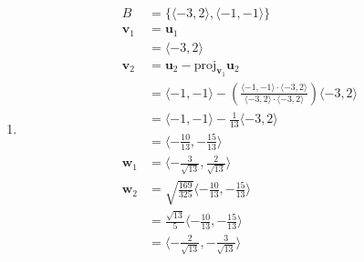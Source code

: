 \documentclass{article}
\begin{document}
\begin{enumerate}
  \item

        \begin{align*}
          B            & = \{ \langle -3, 2 \rangle, \langle -1, -1 \rangle \}                                                                                                                        \\
          \mathbf{v}_1 & = \mathbf{u}_1                                                                                                                                                               \\
                       & = \langle -3, 2 \rangle                                                                                                                                                      \\
          \mathbf{v}_2 & = \mathbf{u}_2 - \text{proj}_{\mathbf{v}_1} \mathbf{u}_2                                                                                                                     \\
                       & = \langle -1, -1 \rangle - \left( \frac{\langle -1, -1 \rangle \cdot \langle -3, 2 \rangle}{\langle -3, 2 \rangle \cdot \langle -3, 2 \rangle} \right) \langle -3, 2 \rangle \\
                       & = \langle -1, -1 \rangle - \frac{1}{13} \langle -3, 2 \rangle                                                                                                                \\
                       & = \langle -\frac{10}{13}, -\frac{15}{13} \rangle                                                                                                                             \\
          \mathbf{w}_1 & = \langle -\frac{3}{\sqrt{13}}, \frac{2}{\sqrt{13}} \rangle                                                                                                                  \\
          \mathbf{w}_2 & = \sqrt{\frac{169}{325}} \langle -\frac{10}{13}, -\frac{15}{13} \rangle                                                                                                      \\
                       & = \frac{\sqrt{13}}{5} \langle -\frac{10}{13}, -\frac{15}{13} \rangle                                                                                                         \\
                       & = \langle -\frac{2}{\sqrt{13}}, -\frac{3}{\sqrt{13}} \rangle
        \end{align*}
\end{enumerate}
\end{document}
